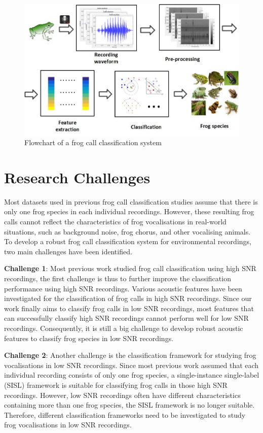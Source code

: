 \begin{figure}[htb!]
\centering
\includegraphics[width=\textwidth]{image/Ch1/flowchart.jpg}
\caption[Flowchart of a frog call classification system]{Flowchart of a frog call classification system}
\label{fig:Ch1_flowchart}
\end{figure}


\section{Research Challenges}
Most datasets used in previous frog call classification studies assume that there is only one frog species in each individual recordings. However, these resulting frog calls cannot reflect the characteristics of frog vocalisations in real-world situations, such as background noise, frog chorus, and other vocalising animals. To develop a robust frog call classification system for environmental recordings, two main challenges have been identified. 


\noindent \textbf{Challenge 1}: Most previous work studied frog call classification using high SNR recordings, the first challenge is thus to further improve the classification performance using high SNR recordings. Various acoustic features have been investigated for the classification of frog calls in high SNR recordings. Since our work finally aims to classify frog calls in low SNR recordings, most features that can successfully classify high SNR recordings cannot perform well for low SNR recordings. Consequently, it is still a big challenge to develop robust acoustic features to classify frog species in low SNR recordings. 

\noindent \textbf{Challenge 2}: Another challenge is the classification framework for studying frog vocalisations in low SNR recordings. Since most previous work assumed that each individual recording consists of only one frog species, a single-instance single-label (SISL) framework is suitable for classifying frog calls in those high SNR recordings. However, low SNR recordings often have different characteristics containing more than one frog species, the SISL framework is no longer suitable. Therefore, different classification frameworks need to be investigated to study frog vocalisations in low SNR recordings.



